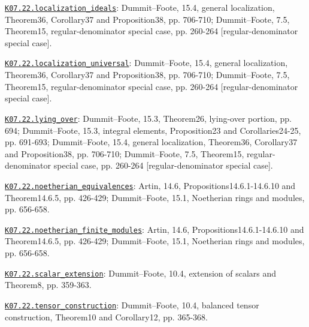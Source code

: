 \par\smallskip\noindent\hypertarget{src:K07.22.localization_ideals}{}\label{src:K07.22.localization_ideals}\hyperref[K07.22.localization_ideals]{\texttt{K07.22.localization\_ideals}}: Dummit--Foote, 15.4, general localization, Theorem36, Corollary37 and Proposition38, pp. 706-710; Dummit--Foote, 7.5, Theorem15, regular-denominator special case, pp. 260-264 [regular-denominator special case].
\par\smallskip\noindent\hypertarget{src:K07.22.localization_universal}{}\label{src:K07.22.localization_universal}\hyperref[K07.22.localization_universal]{\texttt{K07.22.localization\_universal}}: Dummit--Foote, 15.4, general localization, Theorem36, Corollary37 and Proposition38, pp. 706-710; Dummit--Foote, 7.5, Theorem15, regular-denominator special case, pp. 260-264 [regular-denominator special case].
\par\smallskip\noindent\hypertarget{src:K07.22.lying_over}{}\label{src:K07.22.lying_over}\hyperref[K07.22.lying_over]{\texttt{K07.22.lying\_over}}: Dummit--Foote, 15.3, Theorem26, lying-over portion, pp. 694; Dummit--Foote, 15.3, integral elements, Proposition23 and Corollaries24-25, pp. 691-693; Dummit--Foote, 15.4, general localization, Theorem36, Corollary37 and Proposition38, pp. 706-710; Dummit--Foote, 7.5, Theorem15, regular-denominator special case, pp. 260-264 [regular-denominator special case].
\par\smallskip\noindent\hypertarget{src:K07.22.noetherian_equivalences}{}\label{src:K07.22.noetherian_equivalences}\hyperref[K07.22.noetherian_equivalences]{\texttt{K07.22.noetherian\_equivalences}}: Artin, 14.6, Propositions14.6.1-14.6.10 and Theorem14.6.5, pp. 426-429; Dummit--Foote, 15.1, Noetherian rings and modules, pp. 656-658.
\par\smallskip\noindent\hypertarget{src:K07.22.noetherian_finite_modules}{}\label{src:K07.22.noetherian_finite_modules}\hyperref[K07.22.noetherian_finite_modules]{\texttt{K07.22.noetherian\_finite\_modules}}: Artin, 14.6, Propositions14.6.1-14.6.10 and Theorem14.6.5, pp. 426-429; Dummit--Foote, 15.1, Noetherian rings and modules, pp. 656-658.
\par\smallskip\noindent\hypertarget{src:K07.22.scalar_extension}{}\label{src:K07.22.scalar_extension}\hyperref[K07.22.scalar_extension]{\texttt{K07.22.scalar\_extension}}: Dummit--Foote, 10.4, extension of scalars and Theorem8, pp. 359-363.
\par\smallskip\noindent\hypertarget{src:K07.22.tensor_construction}{}\label{src:K07.22.tensor_construction}\hyperref[K07.22.tensor_construction]{\texttt{K07.22.tensor\_construction}}: Dummit--Foote, 10.4, balanced tensor construction, Theorem10 and Corollary12, pp. 365-368.
